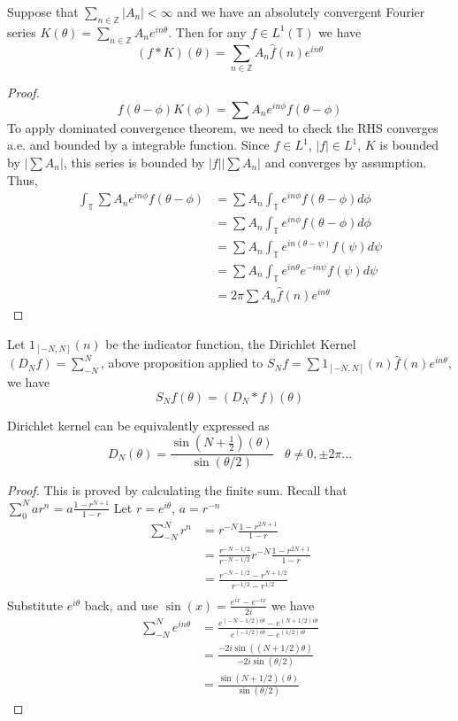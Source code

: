 \documentclass[12pt]{article}
\newenvironment{proposition}[1][Proposition.]{\begin{trivlist}
\item[\hskip \labelsep {\bfseries #1}]}{\end{trivlist}}
\newenvironment{lemma}[1][Lemma.]{\begin{trivlist}
\item[\hskip \labelsep {\bfseries #1}]}{\end{trivlist}}
\begin{document}
\begin{proposition}
Suppose that $\sum_{n\in\mathbb{Z}}|A_n| < \infty$ and we have an absolutely convergent Fourier series $K(\theta) = \sum_{n\in\mathbb{Z}}A_ne^{in\theta}$. Then for any $f \in L^1(\mathbb{T})$ we have \[(f*K)(\theta)=\sum\limits_{n\in\mathbb{Z}}A_n\hat{f}(n)e^{in\theta}\]
\end{proposition}
\begin{proof}
\[
f(\theta-\phi)K(\phi) = \sum A_ne^{in\phi}f(\theta-\phi)
\]
To apply  dominated convergence theorem, we need to check the RHS converges a.e. and bounded by a integrable function.
Since $f \in L^1$, $|f| \in L^1$, $K$ is bounded by $|\sum A_n|$, this series is bounded by $|f| |\sum A_n|$ and converges by assumption.
Thus, 
\begin{align*}
\int_{\mathbb{T}} \sum A_ne^{in\phi}f(\theta-\phi) &= \sum A_n\int_{\mathbb{T}} e^{in\phi}f(\theta-\phi)d\phi \\
&= \sum A_n\int_{\mathbb{T}} e^{in\phi}f(\theta-\phi)d\phi \\
&= \sum A_n\int_{\mathbb{T}} e^{in(\theta-\psi)}f(\psi)d\psi \\
&= \sum A_n\int_{\mathbb{T}} e^{in\theta}e^{-in\psi}f(\psi)d\psi \\
&= 2\pi \sum A_n \hat{f}(n) e^{in\theta}
\end{align*}
\end{proof}
Let $1_{[-N,N]}(n)$ be the indicator function, the Dirichlet Kernel $(D_Nf) = \sum\limits_{-N}^{N}$, above proposition applied to $S_Nf = \sum1_{[-N,N]}(n)\hat{f}(n)e^{in\theta}$, we have \[S_Nf(\theta) = (D_N*f)(\theta)\]
\begin{lemma}
Dirichlet kernel can be equivalently expressed as \[D_N(\theta) = \frac{\sin(N+\frac{1}{2})(\theta)}{\sin(\theta/2)}\ \ \ \ \theta \neq 0, \pm 2\pi ...\]
\end{lemma}
\begin{proof}
This is proved by calculating the finite sum. Recall that $\sum_{0}^{N} ar^n = a\frac{1-r^{N+1}}{1-r}$
Let $r = e^{i\theta}$, $a = r^{-n}$
\begin{align*}
\sum\limits_{-N}^{N} r^n
&= r^{-N}\frac{1-r^{2N+1}}{1-r} \\
&= \frac{r^{-N-1/2}}{r^{-N-1/2}} r^{-N}\frac{1-r^{2N+1}}{1-r}\\
&=  \frac{r^{-N-1/2}-r^{N+1/2}}{r^{-1/2}-r^{1/2}} \\
\end{align*}
Substitute $e^{i\theta}$ back, and use $\sin(x)=\frac{e^{ix}-e^{-ix}}{2i}$ we have
\begin{align*}
\sum\limits_{-N}^{N} e^{in\theta} &= \frac{e^{(-N-1/2)i\theta}-e^{(N+1/2)i\theta}}{e^{(-1/2)i\theta}-e^{(1/2)i\theta}} \\
&= \frac{-2i\sin((N+1/2)\theta)}{-2i\sin(\theta/2)} \\
&= \frac{\sin(N+1/2)(\theta)}{\sin(\theta/2)}
\end{align*}
\end{proof}
\end{document}
